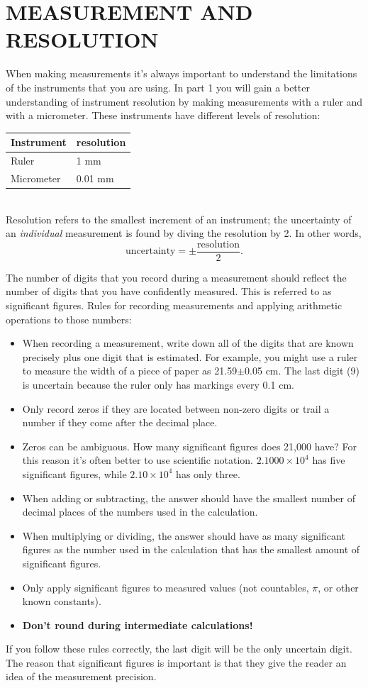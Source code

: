 \documentclass[11pt,letterpaper]{article}
\begin{document}
\section{MEASUREMENT AND RESOLUTION}
When making measurements it's always important to understand the limitations of the instruments that you are using. In part 1 you will gain a better understanding of instrument resolution by making measurements with a ruler and with a micrometer. These instruments have different levels of resolution:
\begin{table}[h]
\begin{tabular}{ll}
Instrument \hspace*{5mm} & resolution\\
\hline
Ruler & 1 mm\\
Micrometer & 0.01 mm\\
\hline
\end{tabular}
\end{table}\\
Resolution refers to the smallest increment of an instrument; the uncertainty of an \textit{individual} measurement is found by diving the resolution by 2. In other words,
$$\mbox{uncertainty}=\pm\frac{\mbox{resolution}}{2}.$$

The number of digits that you record during a measurement should reflect the number of digits that you have confidently measured. This is referred to as significant figures. Rules for recording measurements and applying arithmetic operations to those numbers:
\begin{itemize}
\item When recording a measurement, write down all of the digits that are known precisely plus one digit that is estimated. For example, you might use a ruler to measure the width of a piece of paper as 21.59$\pm$0.05 cm. The last digit (9) is uncertain because the ruler only has markings every 0.1 cm.
\item Only record zeros if they are located between non-zero digits or trail a number if they come after the decimal place.
\item Zeros can be ambiguous. How many significant figures does 21,000 have? For this reason it's often better to use scientific notation. $2.1000\times{10^4}$ has five significant figures, while $2.10\times{10^4}$ has only three.
\item When adding or subtracting, the answer should have the smallest number of decimal places of the numbers used in the calculation.
\item When multiplying or dividing, the answer should have as many significant figures as the number used in the calculation that has the smallest amount of significant figures.
\item Only apply significant figures to measured values (not countables, $\pi$, or other known constants). 
\item \textbf{Don't round during intermediate calculations!}
\end{itemize}
If you follow these rules correctly, the last digit will be the only uncertain digit. The reason that significant figures is important is that they give the reader an idea of the measurement precision.
\end{document}
